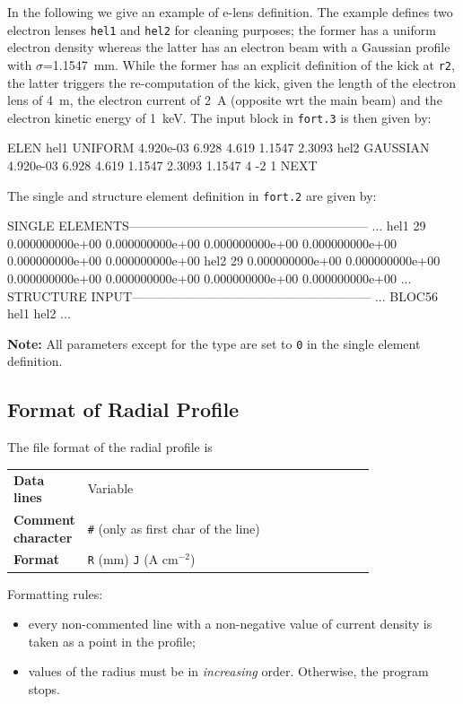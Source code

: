 In the following we give an example of e-lens definition.
The example defines two electron lenses \texttt{hel1} and \texttt{hel2} for cleaning purposes; the former has a uniform electron density whereas the latter has an electron beam with a Gaussian profile with $\sigma$=1.1547~mm.
While the former has an explicit definition of the kick at \texttt{r2}, the latter triggers the re-computation of the kick, given the length of the electron lens of 4~m, the electron current of 2~A (opposite wrt the main beam) and the electron kinetic energy of 1~keV.
The input block in \texttt{fort.3} is then given by:

\begin{cverbatim}
ELEN
hel1 UNIFORM  4.920e-03 6.928 4.619 1.1547 2.3093
hel2 GAUSSIAN 4.920e-03 6.928 4.619 1.1547 2.3093 1.1547 4 -2 1
NEXT
\end{cverbatim}
The single and structure element definition in \texttt{fort.2} are given by:
\begin{ctverbatim}
SINGLE ELEMENTS---------------------------------------------------------
...
hel1            29  0.000000000e+00  0.000000000e+00  0.000000000e+00  0.000000000e+00  0.000000000e+00  0.000000000e+00
hel2            29  0.000000000e+00  0.000000000e+00  0.000000000e+00  0.000000000e+00  0.000000000e+00  0.000000000e+00
...
STRUCTURE INPUT---------------------------------------------------------
...
BLOC56            hel1              hel2
...
\end{ctverbatim}

\bigskip
\noindent \textbf{Note:} All parameters except for the type are set to \texttt{0} in the single element definition.

\subsection{Format of Radial Profile} \label{sec:elen_rad_prof}
The file format of the radial profile is

\bigskip
\begin{tabular}{@{}lp{0.8\linewidth}}
    \textbf{Data lines} & Variable \\
    \textbf{Comment character} & \texttt{\#} (only as first char of the line) \\
    \textbf{Format}     & \texttt{R} (mm) \texttt{J} (A cm$^{-2}$) \\
\end{tabular}

Formatting rules:
\begin{itemize}
\item every non-commented line with a non-negative value of current density is taken as a point in the profile;
\item values of the radius must be in \emph{increasing} order. Otherwise, the program stops.
\end{itemize}

